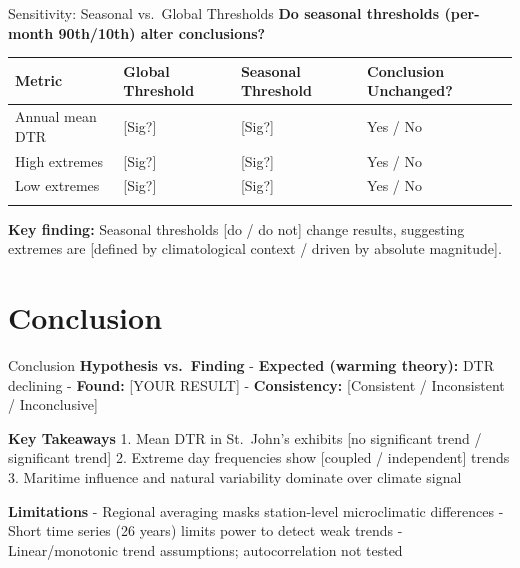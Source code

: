 \documentclass[
  ignorenonframetext,
  aspectratio=32,
]{beamer}
\begin{document}
\begin{frame}{Sensitivity: Seasonal vs.~Global Thresholds}
\textbf{Do seasonal thresholds (per-month 90th/10th) alter conclusions?}

\begin{longtable}[]{@{}
  >{\raggedright\arraybackslash}p{}
  >{\raggedright\arraybackslash}p{}
  >{\raggedright\arraybackslash}p{}
  >{\raggedright\arraybackslash}p{}@{}}
\toprule\noalign{}
\begin{minipage}[b]{\linewidth}\raggedright
Metric
\end{minipage} & \begin{minipage}[b]{\linewidth}\raggedright
Global Threshold
\end{minipage} & \begin{minipage}[b]{\linewidth}\raggedright
Seasonal Threshold
\end{minipage} & \begin{minipage}[b]{\linewidth}\raggedright
Conclusion Unchanged?
\end{minipage} \\
\midrule\noalign{}
\endhead
Annual mean DTR & {[}Sig?{]} & {[}Sig?{]} & Yes / No \\
High extremes & {[}Sig?{]} & {[}Sig?{]} & Yes / No \\
Low extremes & {[}Sig?{]} & {[}Sig?{]} & Yes / No \\
\bottomrule\noalign{}
\end{longtable}

\textbf{Key finding:} Seasonal thresholds {[}do / do not{]} change
results, suggesting extremes are {[}defined by climatological context /
driven by absolute magnitude{]}.
\end{frame}

\section{Conclusion}\label{conclusion}

\begin{frame}{Conclusion}
\textbf{Hypothesis vs.~Finding} - \textbf{Expected (warming theory):}
DTR declining - \textbf{Found:} {[}YOUR RESULT{]} -
\textbf{Consistency:} {[}Consistent / Inconsistent / Inconclusive{]}

\textbf{Key Takeaways} 1. Mean DTR in St.~John's exhibits {[}no
significant trend / significant trend{]} 2. Extreme day frequencies show
{[}coupled / independent{]} trends 3. Maritime influence and natural
variability dominate over climate signal

\textbf{Limitations} - Regional averaging masks station-level
microclimatic differences - Short time series (26 years) limits power to
detect weak trends - Linear/monotonic trend assumptions; autocorrelation
not tested
\end{frame}

\begin{frame}
\end{frame}
\end{document}
